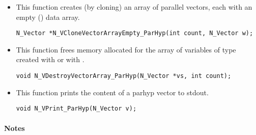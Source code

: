 \begin{itemize}

\item {}
 
  This function creates (by cloning) an array of  parallel vectors,
  each with an empty () data array.
 
\begin{verbatim}
N_Vector *N_VCloneVectorArrayEmpty_ParHyp(int count, N_Vector w);
\end{verbatim}


\item {}
 
 This function frees memory allocated for the array of   variables of
 type  created with  or with
 .
 

 \verb|void N_VDestroyVectorArray_ParHyp(N_Vector *vs, int count);|



\item {}
  
  This function prints the content of a parhyp vector to stdout.
 
    
  \verb|void N_VPrint_ParHyp(N_Vector v);|


\end{itemize}
\paragraph{\bf Notes} 
           
